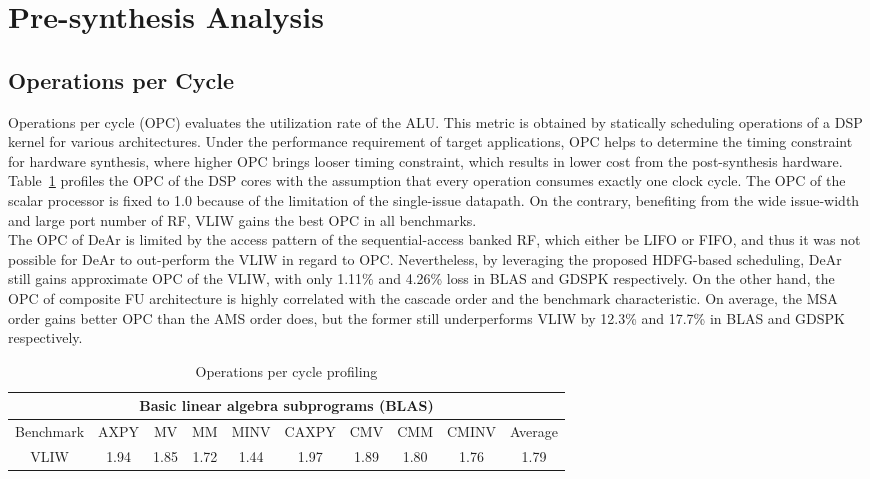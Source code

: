 \section{Pre-synthesis Analysis}
{
    \subsection{Operations per Cycle}
    Operations per cycle (OPC) evaluates the utilization rate of the ALU.
    This metric is obtained by statically scheduling operations of a DSP kernel for various architectures.
    Under the performance requirement of target applications, OPC helps to determine the timing constraint for hardware synthesis, 
    where higher OPC brings looser timing constraint, which results in lower cost from the post-synthesis hardware.
    Table~\ref{tab:opc} profiles the OPC of the DSP cores with the assumption that every operation consumes exactly one clock cycle.
    The OPC of the scalar processor is fixed to 1.0 because of the limitation of the single-issue datapath.
    On the contrary, benefiting from the wide issue-width and large port number of RF, VLIW gains the best OPC in all benchmarks.
    \\\indent
    The OPC of DeAr is limited by the access pattern of the sequential-access banked RF, which either be LIFO or FIFO, 
    and thus it was not possible for DeAr to out-perform the VLIW in regard to OPC.
    Nevertheless, by leveraging the proposed HDFG-based scheduling,  
    DeAr still gains approximate OPC of the VLIW, with only 1.11\% and 4.26\% loss in BLAS and GDSPK respectively.
    On the other hand, the OPC of composite FU architecture is highly correlated with the cascade order and the benchmark characteristic. 
    On average, the MSA order gains better OPC than the AMS order does, 
    but the former still underperforms VLIW by 12.3\% and 17.7\% in BLAS and GDSPK respectively.
    \begin{table}[!ht]
        \centering
        \caption{Operations per cycle profiling}
        \label{tab:opc}
        \resizebox{\columnwidth}{!}
        {
            \begin{tabular}{|c|c|c|c|c|c|c|c|c|c|}
                \hline
                \multicolumn{10}{|c|}{\textbf{Basic linear algebra subprograms (BLAS)}} \\ \hline
                Benchmark  &  AXPY  &  MV  &  MM  &  MINV  &  CAXPY  &  CMV  &  CMM  &  CMINV  &  Average \\ \hline 
                VLIW  &   1.94  &   1.85  &   1.72  &   1.44  &   1.97  &   1.89  &   1.80  &   1.76  &   1.79     \\ \hline 

\end{tabular}}
\end{table}}
